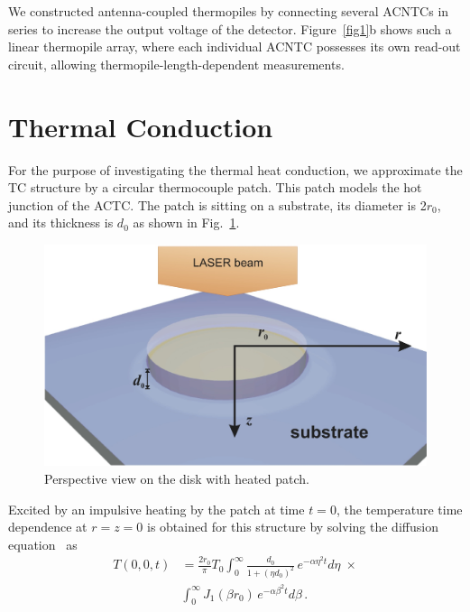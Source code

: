 \documentclass[journal]{IEEEtran}
\begin{document}
We constructed antenna-coupled thermopiles by connecting several ACNTCs in series to increase the output voltage of the detector. Figure~\ref{fig1}b shows such a linear thermopile array, where each individual ACNTC possesses its own read-out circuit, allowing thermopile-length-dependent measurements. 
%
\section{Thermal Conduction}\label{ThermalConduction}
%
%
%
For the purpose of investigating the thermal heat conduction, we approximate the TC structure by  a circular thermocouple patch. This patch models the hot junction of the ACTC. The patch is sitting on a substrate, its diameter is 2$r_0$, and its thickness is $d_0$ as shown in Fig.~\ref{fig.disk}.
%
\begin{figure}[h]
\centerline{\includegraphics[width=0.85\columnwidth,clip]{figures/TC_fig2}}
\caption{Perspective view on the disk with heated patch.}
\label{fig.disk}
\end{figure}
%
Excited by an impulsive heating by the patch at time $t=0$, the temperature time dependence at $r=z=0$ is obtained for this structure by solving the diffusion equation~\cite{russer_nanostructured_2015} as
%
\begin{align} 
	T(0,0,t)  & =  \frac{2r_0}{\pi}T_0 \! \int_{0}^\infty  \!  \frac{d_0}{1+(\eta d_0)^2} \, e^{-\alpha \eta^2  t}  d \eta  \; \times \nonumber \\
	 &  \int_{0}^\infty  \!  J_1(\beta r_0)\, e^{-\alpha \beta^2  t}  d \beta  \, .
	\label{heat015}
\end{align}
\end{document}

